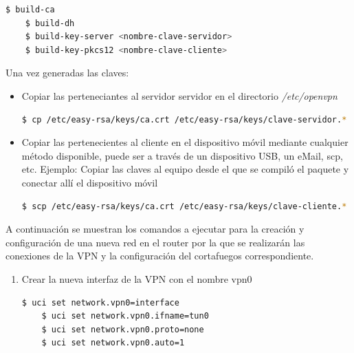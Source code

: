 \documentclass[12pt]{article}
\begin{document}
\begin{enumerate}
                    \begin{lstlisting}[language=bash]
    $ build-ca
    $ build-dh
    $ build-key-server <nombre-clave-servidor>
    $ build-key-pkcs12 <nombre-clave-cliente>
                    \end{lstlisting}

                    Una vez generadas las claves:
                    
                        \begin{itemize}

                            \item Copiar las perteneciantes al servidor servidor en el directorio \textit{/etc/openvpn}
                            \begin{lstlisting}[language=bash]
    $ cp /etc/easy-rsa/keys/ca.crt /etc/easy-rsa/keys/clave-servidor.* /etc/easy-rsa/keys/dh2048.pem /etc/openvpn
                            \end{lstlisting}

                            \item Copiar las pertenecientes al cliente en el dispositivo móvil mediante cualquier método disponible, puede ser a través de un dispositivo USB, un eMail, scp, etc.
                            Ejemplo: Copiar las claves al equipo desde el que se compiló el paquete y conectar allí el dispositivo móvil
                            \begin{lstlisting}[language=bash]
    $ scp /etc/easy-rsa/keys/ca.crt /etc/easy-rsa/keys/clave-cliente.* root@192.168.0.100:/etc/openvpn
                            \end{lstlisting}
                        \end{itemize}   
                    
                    A continuación se muestran los comandos a ejecutar para la creación y configuración de una nueva red en el router por la que se realizarán las conexiones de la VPN y la configuración del cortafuegos correspondiente.

                    \begin{enumerate}
                        \item Crear la nueva interfaz de la VPN con el nombre vpn0
                            
                        \begin{lstlisting}[language=bash]
    $ uci set network.vpn0=interface
    $ uci set network.vpn0.ifname=tun0
    $ uci set network.vpn0.proto=none
    $ uci set network.vpn0.auto=1        
                        \end{lstlisting}


\end{enumerate}
\end{enumerate}
\end{document}

